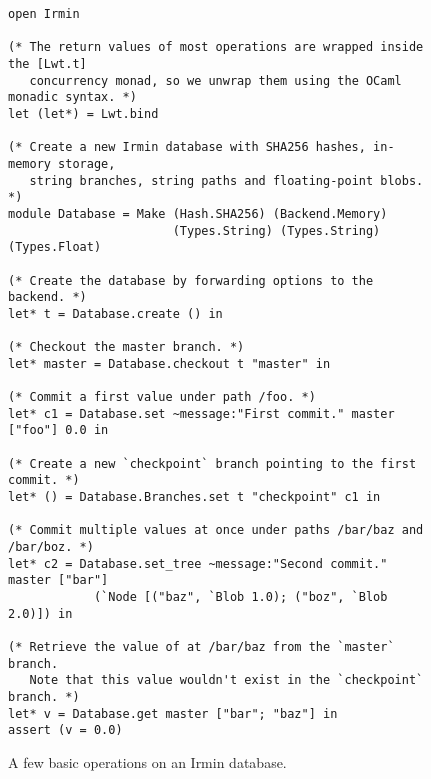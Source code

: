 \begin{figure}[ht]
  \caption{A few basic operations on an Irmin database.}
  \label{lst:irmin-example}

  \centering
  \vspace{-1em}
  \begin{verbatim}
open Irmin

(* The return values of most operations are wrapped inside the [Lwt.t]
   concurrency monad, so we unwrap them using the OCaml monadic syntax. *)
let (let*) = Lwt.bind

(* Create a new Irmin database with SHA256 hashes, in-memory storage,
   string branches, string paths and floating-point blobs. *)
module Database = Make (Hash.SHA256) (Backend.Memory)
                       (Types.String) (Types.String) (Types.Float)

(* Create the database by forwarding options to the backend. *)
let* t = Database.create () in

(* Checkout the master branch. *)
let* master = Database.checkout t "master" in

(* Commit a first value under path /foo. *)
let* c1 = Database.set ~message:"First commit." master ["foo"] 0.0 in

(* Create a new `checkpoint` branch pointing to the first commit. *)
let* () = Database.Branches.set t "checkpoint" c1 in

(* Commit multiple values at once under paths /bar/baz and /bar/boz. *)
let* c2 = Database.set_tree ~message:"Second commit." master ["bar"]
            (`Node [("baz", `Blob 1.0); ("boz", `Blob 2.0)]) in

(* Retrieve the value of at /bar/baz from the `master` branch.
   Note that this value wouldn't exist in the `checkpoint` branch. *)
let* v = Database.get master ["bar"; "baz"] in
assert (v = 0.0)
    \end{verbatim}
\end{figure}
